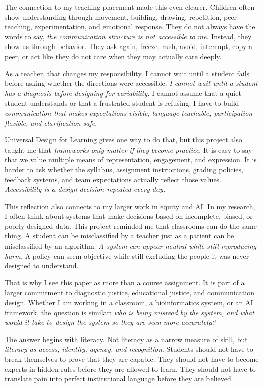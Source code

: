 The connection to my teaching placement made this even clearer. Children often show understanding through movement, building, drawing, repetition, peer teaching, experimentation, and emotional response. They do not always have the words to say, \textit{the communication structure is not accessible to me}. Instead, they show us through behavior. They ask again, freeze, rush, avoid, interrupt, copy a peer, or act like they do not care when they may actually care deeply.

As a teacher, that changes my responsibility. I cannot wait until a student fails before asking whether the directions were accessible. \textit{I cannot wait until a student has a diagnosis before designing for variability.} I cannot assume that a quiet student understands or that a frustrated student is refusing. I have to build \textit{communication that makes expectations visible, language teachable, participation flexible, and clarification safe}.

Universal Design for Learning gives one way to do that, but this project also taught me that \textit{frameworks only matter if they become practice}. It is easy to say that we value multiple means of representation, engagement, and expression. It is harder to ask whether the syllabus, assignment instructions, grading policies, feedback systems, and team expectations actually reflect those values. \textit{Accessibility is a design decision repeated every day.}

This reflection also connects to my larger work in equity and AI. In my research, I often think about systems that make decisions based on incomplete, biased, or poorly designed data. This project reminded me that classrooms can do the same thing. A student can be misclassified by a teacher just as a patient can be misclassified by an algorithm. \textit{A system can appear neutral while still reproducing harm.} A policy can seem objective while still excluding the people it was never designed to understand.

That is why I see this paper as more than a course assignment. It is part of a larger commitment to diagnostic justice, educational justice, and communication design. Whether I am working in a classroom, a bioinformatics system, or an AI framework, the question is similar: \textit{who is being misread by the system, and what would it take to design the system so they are seen more accurately?}

The answer begins with literacy. Not literacy as a narrow measure of skill, but \textit{literacy as access, identity, agency, and recognition}. Students should not have to break themselves to prove that they are capable. They should not have to become experts in hidden rules before they are allowed to learn. They should not have to translate pain into perfect institutional language before they are believed.

